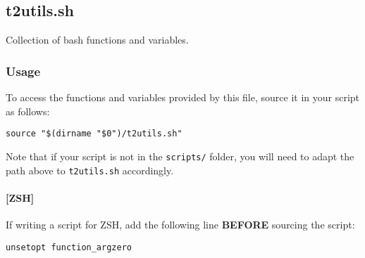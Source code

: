 \documentclass[documentation]{subfiles}
\begin{document}

\subsection{t2utils.sh}\label{t2utils.sh}
Collection of bash functions and variables.

\subsubsection{Usage}
To access the functions and variables provided by this file, source it in your script as follows:
\begin{center}{\tt source "\$(dirname "\$0")/t2utils.sh"}\end{center}
Note that if your script is not in the {\tt scripts/} folder, you will need to adapt the path above to {\tt t2utils.sh} accordingly.

\paragraph{[ZSH]} If writing a script for ZSH, add the following line {\bf BEFORE} sourcing the script:
\begin{center}{\tt unsetopt function\_argzero}\end{center}

\clearpage
\end{document}
